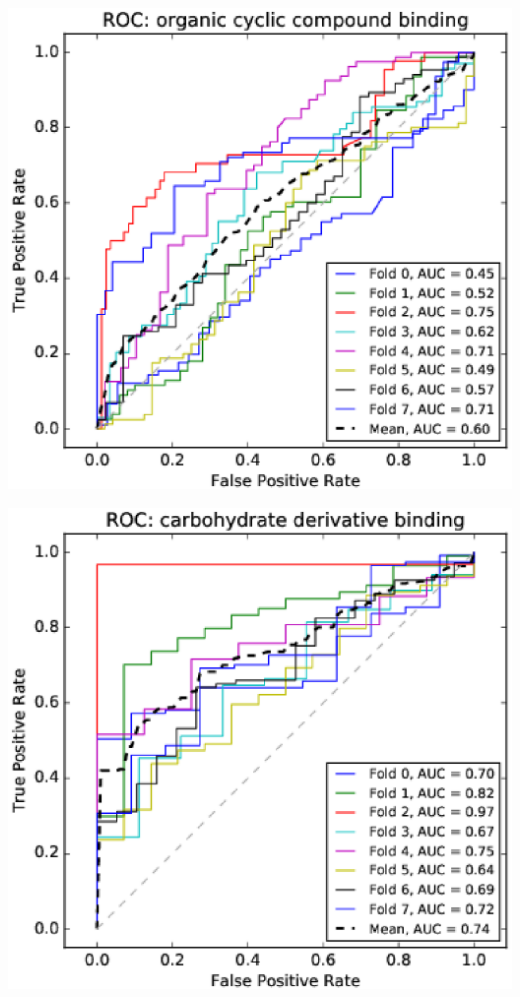 \documentclass[11pt,twoside,a4paper]{book}
\newenvironment{Figure}
  {\par\medskip\noindent\minipage{\linewidth}}
  {\endminipage\par\medskip}
\begin{document}
\begin{multicols}{2}
\begin{Figure}\begin{center}\includegraphics[width=\linewidth]{figures/roc_organic_cyclic_compound_binding}\label{fig:roc_organic_cyclic_compound_binding}\end{center}\end{Figure}
\begin{Figure}\begin{center}\includegraphics[width=\linewidth]{figures/roc_carbohydrate_derivative_binding}\label{fig:roc_carbohydrate_derivative_binding}\end{center}\end{Figure}

\end{multicols}
\end{document}
